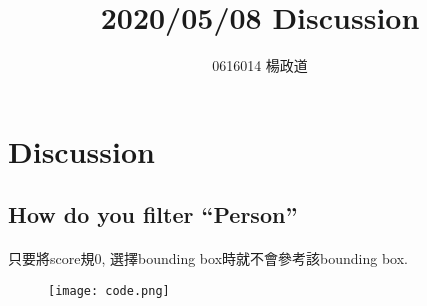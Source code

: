 \title{2020/05/08 Discussion}
\author{0616014 楊政道}
\maketitle
\thispagestyle{fancy}
\section{Discussion}
\subsection{How do you filter “Person”}
\paragraph{}
只要將score規0, 選擇bounding box時就不會參考該bounding box.
\begin{figure}[!h]
    \begin{center}
        \texttt{[image: code.png]}
    \end{center}
\end{figure}

